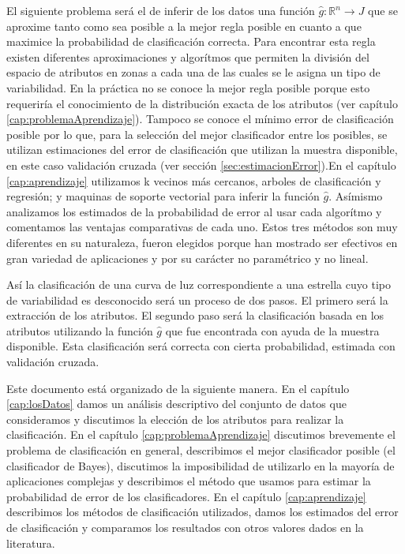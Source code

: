 \documentclass[letterpaper,12pt]{book}
\begin{document}
El siguiente problema será el de inferir de los datos una función $\hat{g}:\mathbb{R}^n\rightarrow J$ que se aproxime tanto como sea posible a la mejor regla posible en cuanto a que maximice la probabilidad de clasificación correcta. Para encontrar esta regla existen diferentes aproximaciones y algorítmos que permiten la división del espacio de atributos en zonas a cada una de las cuales se le asigna un tipo de variabilidad. En la práctica no se conoce la mejor regla posible porque esto requeriría el conocimiento de la distribución exacta de los atributos (ver capítulo \ref{cap:problemaAprendizaje}). Tampoco se conoce el mínimo error de clasificación posible por lo que, para la selección del mejor clasificador entre los posibles, se utilizan estimaciones del error de clasificación que utilizan la muestra disponible, en este caso validación cruzada (ver sección \ref{sec:estimacionError}).En el capítulo \ref{cap:aprendizaje} utilizamos k vecinos más cercanos, arboles de clasificación y regresión; y maquinas de soporte vectorial para inferir la función $\hat{g}$. Asímismo analizamos los estimados de la probabilidad de error al usar cada algorítmo y comentamos las ventajas comparativas de cada uno. Estos tres métodos son muy diferentes en su naturaleza, fueron elegidos porque han mostrado ser efectivos en gran variedad de aplicaciones y por su carácter no paramétrico y no lineal. 

Así la clasificación de una curva de luz correspondiente a una estrella cuyo tipo de variabilidad es desconocido será un proceso de dos pasos. El primero será la extracción de los atributos. El segundo paso será la clasificación basada en los atributos utilizando la función $\hat{g}$ que fue encontrada con ayuda de la muestra disponible. Esta clasificación será correcta con cierta probabilidad, estimada con validación cruzada.

Este documento está organizado de la siguiente manera. En el capítulo \ref{cap:losDatos} damos un análisis descriptivo del conjunto de datos que consideramos y discutimos la elección de los atributos para realizar la clasificación. En el capítulo \ref{cap:problemaAprendizaje} discutimos brevemente el problema de clasificación en general, describimos el mejor clasificador posible (el clasificador de Bayes), discutimos la imposibilidad de utilizarlo en la mayoría de aplicaciones complejas y describimos el método que usamos para estimar la probabilidad de error de los clasificadores. En el capítulo \ref{cap:aprendizaje} describimos los métodos de clasificación utilizados, damos los estimados del error de clasificación y comparamos los resultados con otros valores dados en la literatura.
\end{document}
